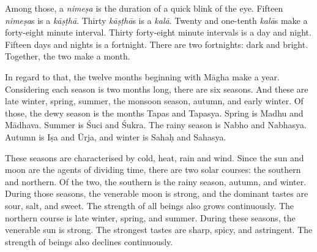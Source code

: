 \begin{translation}
\item [4] 
Among those, %
a \emph{nimeṣa} is the duration of a quick blink of the eye. %
Fifteen \emph{nimeṣa}s is a \emph{kāṣṭhā}. %
Thirty \emph{kāṣṭhā}s is a \emph{kalā}. %
Twenty and one-tenth \emph{kalā}s make a forty-eight minute interval. %
Thirty forty-eight minute intervals is a day and night. %
Fifteen days and nights is a fortnight. %
There are two fortnights: dark and bright. Together, the two make a month. 


\item [5] 
In regard to that, %
the twelve months beginning with Māgha make a year. %
Considering each season is two months long, there are six seasons. %
And these are late winter, %
spring, %
summer, %
the monsoon season, %
autumn, %
and early winter. %
%
Of those, the dewy season is the months Tapas and Tapasya. Spring is Madhu and Mādhava. Summer is Śuci and Śukra. The rainy season is Nabho and Nabhasya. Autumn is Iṣa and Ūrja, and winter is Sahaḥ and Sahasya.

\item [6] 
These seasons are characterised by cold, heat, rain and wind. %
Since the sun and moon are the agents of dividing time, %
there are two solar courses: %
the southern and northern. %
Of the two, the southern is the rainy season, autumn, and winter. During those seasons, the venerable moon is strong, %
and the dominant tastes are sour, salt, and sweet. %
The strength of all beings also grows continuously. %
The northern course is late winter, spring, and summer. %
During these seasons, the venerable sun is strong. %
The strongest tastes are sharp, spicy, and astringent. %
The strength of beings also declines continuously.  


\end{translation}
